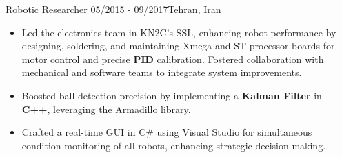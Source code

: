 \resumeSubheadingReza
{Robotic Researcher}{}
{05/2015 - 09/2017}{Tehran, Iran}
{
    \vspace{-12pt}
    \begin{itemize}
        \item{Led the electronics team in KN2C's SSL, enhancing robot performance by designing, soldering, and maintaining Xmega and ST processor boards for motor control and precise \textbf{PID} calibration. Fostered collaboration with mechanical and software teams to integrate system improvements.}
        
        \item{Boosted ball detection precision by implementing a \textbf{Kalman Filter} in \textbf{C++}, leveraging the Armadillo library.}
        \item{Crafted a real-time GUI in C\# using Visual Studio for simultaneous condition monitoring of all robots, enhancing strategic decision-making.}
    \end{itemize}
}


